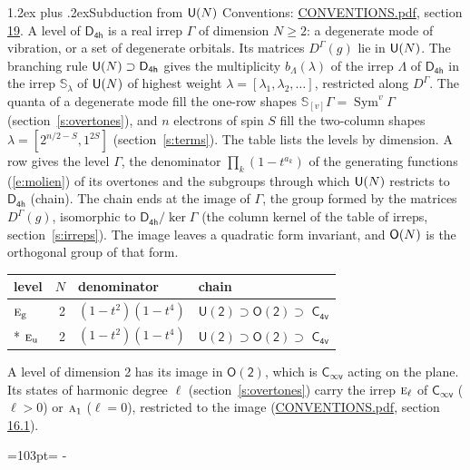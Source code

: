 \documentclass[10pt,a4paper]{article}
\makeatletter
\renewcommand\section{\@startsection{section}{1}{\z@}{-3ex plus -1ex minus -.2ex}%
  {1.2ex plus .2ex}{\normalfont\large\sffamily\bfseries\color{parttitle}}}
\newcommand{\needspace}[1]{\par\penalty-100\begingroup\dimen0=#1\relax\dimen2=\pagegoal
  \advance\dimen2-\pagetotal\ifdim\dimen0>\dimen2\relax\ifdim\dimen2>0pt\vfil\break\fi\fi
  \endgroup}
\numberwithin{equation}{section}
\newcommand{\grp}[1]{\mathsf{#1}}
\newcommand{\irr}[1]{\text{\normalfont\scshape #1}}
\newcommand{\ptag}[1]{\mathrm{#1}}
\newcommand{\repD}[1]{D^{#1}}
\newcommand{\schur}[1]{\mathbb{S}_{#1}}
\newcommand{\shape}[1]{[#1]}
\makeatother
\begin{document}
\section{Subduction from \texorpdfstring{$\grp{U(\mathnormal{N})}$}{U(N)}}\label{s:unitary}
Conventions: \href{../../CONVENTIONS.pdf}{CONVENTIONS.pdf}, section \href{../../CONVENTIONS.pdf\#conv.19}{19}.
\leavevmode\label{n:local.level.dimension}A level of $\grp{D_{4h}}$ is a real irrep $\Gamma$ of dimension $N \ge 2$: a degenerate mode of vibration, or a set of degenerate orbitals. \label{n:group.unitary}Its matrices $\repD{\Gamma}(g)$ lie in $\grp{U(\mathnormal{N})}$. \label{n:irrep.schur}\label{n:shape.partition}\label{n:local.partition}\label{n:function.multiplicity.unitary}The branching rule $\grp{U(\mathnormal{N})} \supset \grp{D_{4h}}$ gives the multiplicity $b_\Lambda(\lambda)$ of the irrep $\Lambda$ of $\grp{D_{4h}}$ in the irrep $\schur{\lambda}$ of $\grp{U(\mathnormal{N})}$ of highest weight $\lambda = \shape{\lambda_1, \lambda_2, \dots}$, restricted along $\repD{\Gamma}$. \label{n:local.partition.power}\label{n:local.electrons}\label{n:local.spin}The quanta of a degenerate mode fill the one-row shapes $\schur{\shape{v}}\Gamma = \operatorname{Sym}^{v}\Gamma$ (section~\ref{s:overtones}), and $n$ electrons of spin $S$ fill the two-column shapes $\lambda = \shape{2^{n/2-S}, 1^{2S}}$ (section~\ref{s:terms}).
The table lists the levels by dimension. \label{n:head.level}\label{n:head.denominator}\label{n:index.overtone.denominator}\label{n:head.chain}A row gives the level $\Gamma$, the denominator $\prod_k (1 - t^{a_k})$ of the generating functions (\ref{e:molien}) of its overtones and the subgroups through which $\grp{U(\mathnormal{N})}$ restricts to $\grp{D_{4h}}$ (chain). The chain ends at the image of $\Gamma$, the group formed by the matrices $\repD{\Gamma}(g)$, isomorphic to $\grp{D_{4h}}/\ker\Gamma$ (the column kernel of the table of irreps, section~\ref{s:irreps}). The image leaves a quadratic form invariant, and $\grp{O(\mathnormal{N})}$ is the orthogonal group of that form.
{\small\begin{longtable}{@{}lrll@{}}\toprule
level & $N$ & denominator & chain\\\midrule\endhead
\bottomrule\endfoot\endlastfoot
$\irr{e}_{\ptag{g}}$ & 2 & $(1-t^{2})(1-t^{4})$ & $\grp{U(2)} \supset \grp{O(2)} \supset$ \href{C4v.pdf}{$\grp{C_{4v}}$}\\*
$\irr{e}_{\ptag{u}}$ & 2 & $(1-t^{2})(1-t^{4})$ & $\grp{U(2)} \supset \grp{O(2)} \supset$ \href{C4v.pdf}{$\grp{C_{4v}}$}\\
\bottomrule\end{longtable}}
A level of dimension 2 has its image in $\grp{O(2)}$, which is \href{Cinfv.pdf}{$\grp{C_{\infty v}}$} acting on the plane. \label{n:index.harmonic.degree}Its states of harmonic degree $\ell$ (section~\ref{s:overtones}) carry the irrep $\irr{e}_{\ell}$ of \href{Cinfv.pdf}{$\grp{C_{\infty v}}$} ($\ell > 0$) or $\irr{a}_{1}$ ($\ell = 0$), restricted to the image (\href{../../CONVENTIONS.pdf}{CONVENTIONS.pdf}, section \href{../../CONVENTIONS.pdf\#conv.16.1}{16.1}).
\needspace{103pt}
\end{document}
